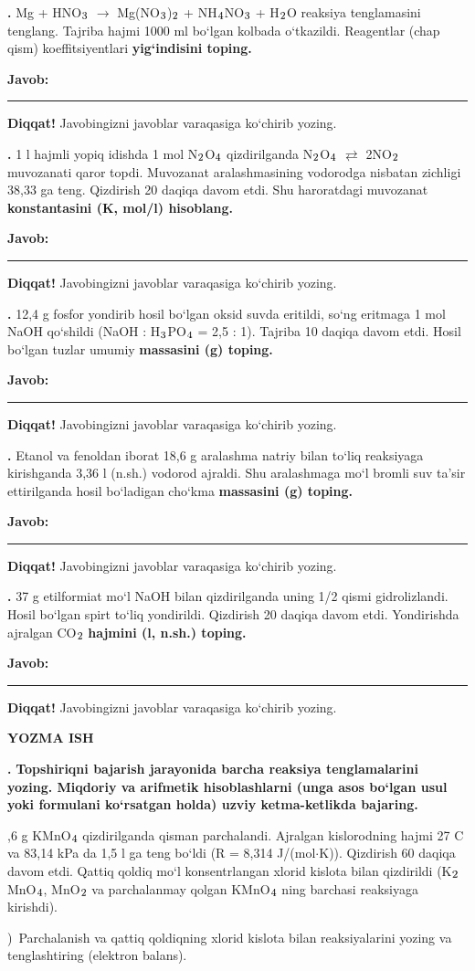 \documentclass[11pt,a4paper]{article}
\renewcommand{\textsubscript}[1]{\ensuremath{_{\text{\fontsize{8}{8}\selectfont #1}}}}
\newcommand{\qn}[1]{\textbf{\fontsize{11.5}{13}\selectfont #1}}
\newcommand{\qsep}{\par\vspace{13pt}}
\newcommand{\javob}{\par\nopagebreak[4]\smallskip\noindent\textbf{Javob:} \rule[-2pt]{7.5cm}{0.4pt}\par\smallskip\noindent\textbf{Diqqat!} Javobingizni javoblar varaqasiga ko`chirib yozing.\par\medskip}
\begin{document}
\par\bigskip
\noindent\qn{36.} Mg + HNO\textsubscript{3} $\to$ Mg(NO\textsubscript{3})\textsubscript{2} + NH\textsubscript{4}NO\textsubscript{3} + H\textsubscript{2}O reaksiya tenglamasini tenglang. Tajriba hajmi 1000 ml bo`lgan kolbada o`tkazildi. Reagentlar (chap qism) koeffitsiyentlari \textbf{yig`indisini toping.}
\javob\qsep
\noindent\qn{37.} 1 l hajmli yopiq idishda 1 mol N\textsubscript{2}O\textsubscript{4} qizdirilganda N\textsubscript{2}O\textsubscript{4} $\rightleftarrows$ 2NO\textsubscript{2} muvozanati qaror topdi. Muvozanat aralashmasining vodorodga nisbatan zichligi 38,33 ga teng. Qizdirish 20 daqiqa davom etdi. Shu haroratdagi muvozanat \textbf{konstantasini (K, mol/l) hisoblang.}
\javob\qsep
\noindent\qn{38.} 12,4 g fosfor yondirib hosil bo`lgan oksid suvda eritildi, so`ng eritmaga 1 mol NaOH qo`shildi (NaOH : H\textsubscript{3}PO\textsubscript{4} = 2,5 : 1). Tajriba 10 daqiqa davom etdi. Hosil bo`lgan tuzlar umumiy \textbf{massasini (g) toping.}
\javob\qsep
\noindent\qn{39.} Etanol va fenoldan iborat 18,6 g aralashma natriy bilan to`liq reaksiyaga kirishganda 3,36 l (n.sh.) vodorod ajraldi. Shu aralashmaga mo`l bromli suv ta'sir ettirilganda hosil bo`ladigan cho`kma \textbf{massasini (g) toping.}
\javob\qsep
\noindent\qn{40.} 37 g etilformiat mo`l NaOH bilan qizdirilganda uning 1/2 qismi gidrolizlandi. Hosil bo`lgan spirt to`liq yondirildi. Qizdirish 20 daqiqa davom etdi. Yondirishda ajralgan CO\textsubscript{2} \textbf{hajmini (l, n.sh.) toping.}
\javob\qsep
\par\bigskip\begin{center}\textbf{\fontsize{13}{15}\selectfont YOZMA ISH}\end{center}
\noindent\qn{41.} \textbf{Topshiriqni bajarish jarayonida barcha reaksiya tenglamalarini yozing. Miqdoriy va arifmetik hisoblashlarni (unga asos bo`lgan usul yoki formulani ko`rsatgan holda) uzviy ketma-ketlikda bajaring.}\par{},6 g KMnO\textsubscript{4} qizdirilganda qisman parchalandi. Ajralgan kislorodning hajmi 27 \textdegree{}C va 83,14 kPa da 1,5 l ga teng bo`ldi (R = 8,314 J/(mol$\cdot$K)). Qizdirish 60 daqiqa davom etdi. Qattiq qoldiq mo`l konsentrlangan xlorid kislota bilan qizdirildi (K\textsubscript{2}MnO\textsubscript{4}, MnO\textsubscript{2} va parchalanmay qolgan KMnO\textsubscript{4} ning barchasi reaksiyaga kirishdi).\par
{})\ Parchalanish va qattiq qoldiqning xlorid kislota bilan reaksiyalarini yozing va tenglashtiring (elektron balans).\par
\end{document}
